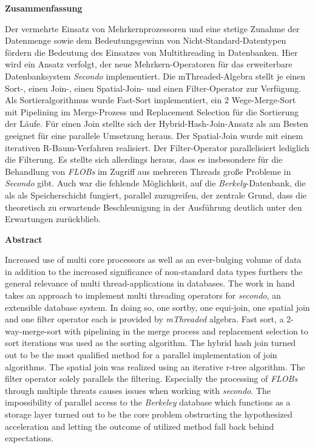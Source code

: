 \documentclass[a4paper,12pt,twoside]{article}
\newcommand{\Fb}[1]{\textit{#1}} %
\begin{document}
\clearpage

\textbf{Zusammenfassung}

Der vermehrte Einsatz von Mehrkernprozessoren und eine stetige Zunahme der Datenmenge sowie dem Bedeutungsgewinn von Nicht-Standard-Datentypen fördern die Bedeutung des Einsatzes von Multithreading in Datenbanken. Hier wird ein Ansatz verfolgt, der neue Mehrkern-Operatoren für das erweiterbare Datenbanksystem \Fb{Secondo} implementiert. Die mThreaded-Algebra stellt je einen Sort-, einen Join-, einen Spatial-Join- und einen Filter-Operator zur Verfügung. Als Sortieralgorithmus wurde Fast-Sort implementiert, ein 2 Wege-Merge-Sort mit Pipelining im Merge-Prozess und Replacement Selection für die Sortierung der Läufe. Für einen Join stellte sich der Hybrid-Hash-Join-Ansatz als am Besten geeignet für eine parallele Umsetzung heraus. Der Spatial-Join wurde mit einem iterativen R-Baum-Verfahren realisiert. Der Filter-Operator parallelisiert lediglich die Filterung. Es stellte sich allerdings heraus, dass es insbesondere für die Behandlung von \Fb{FLOBs} im Zugriff aus mehreren Threads große Probleme in \Fb{Secondo} gibt. Auch war die fehlende Möglichkeit, auf die \Fb{Berkely}-Datenbank, die als als Speicherschicht fungiert, parallel zuzugreifen, der zentrale Grund, dass die theoretisch zu erwartende Beschleunigung in der Ausführung deutlich unter den Erwartungen zurückblieb.
\bigskip

\textbf{Abstract}

Increased use of multi core processors as well as an ever-bulging volume of data in addition to the increased significance of non-standard data types furthers the general relevance of multi thread-applications in databases. The work in hand takes an approach to implement multi threading operators for \Fb{secondo}, an extensible database system. In doing so, one sortby, one equi-join, one spatial join and one filter operator each is provided by \Fb{mThreaded} algebra. Fast sort, a 2-way-merge-sort with pipelining in the merge process and replacement selection to sort iterations was used as the sorting algorithm. The hybrid hash join turned out to be the most qualified method for a parallel implementation of join algorithms. The spatial join was realized using an iterative r-tree algorithm. The filter operator solely parallels the filtering. Especially the processing of \Fb{FLOBs} through multiple threats causes issues when working with \Fb{secondo}. The impossibility of parallel access to the \Fb{Berkeley} database which functions as a storage layer turned out to be the core problem obstructing the hypothesized acceleration and letting the outcome of utilized method fall back behind expectations.
\end{document}
